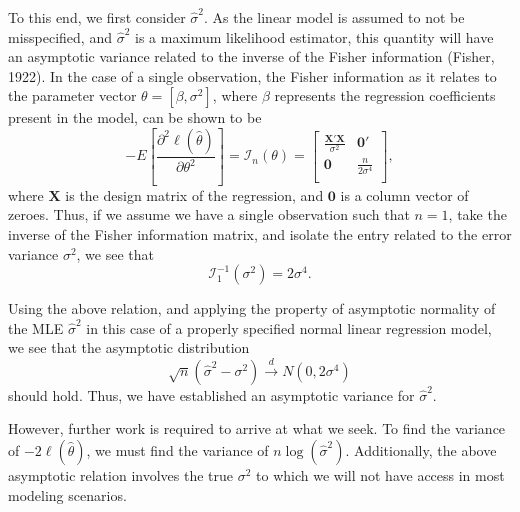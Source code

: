 		To this end, we first consider $\hat{\sigma}^2$. As the linear model is assumed to not be misspecified, and $\hat{\sigma}^2$ is a maximum likelihood
		estimator, this quantity will have an asymptotic variance related to the inverse of the Fisher information (Fisher, 1922). In the case of a single
		observation, the Fisher information as it relates to the parameter vector $\theta = [\beta, \sigma^2]$, where $\beta$ represents the regression coefficients
		present in the model, can be shown to be
		\begin{equation}
			- E \left[ \frac{\partial^2 \ell (\hat{\theta}  )}{\partial \theta^2} \right] = \mathcal{I}_{n}(\theta) =
			\begin{bmatrix}
				\frac{\mathbf{X}' \mathbf{X}}{\sigma^2} & \mathbf{0}' \\
				\mathbf{0} & \frac{n}{2 \sigma^4} \\
			\end{bmatrix}
			,
		\end{equation}
		where $\mathbf{X}$ is the design matrix of the regression, and $\mathbf{0}$ is a column vector of zeroes. Thus, if we assume we have a single observation
		such that $n=1$, take the inverse of the Fisher information matrix, and isolate the entry related to the error variance $\sigma^2$, we see that
		\begin{equation}
			\mathcal{I}_{1}^{-1}(\sigma ^2) = 2 \sigma ^4 .
		\end{equation}
		
		Using the above relation, and applying the property of asymptotic normality of the MLE $\hat{\sigma}^2$ in this case of a properly specified normal linear
		regression model, we see that the asymptotic distribution
		\begin{equation}
			\sqrt{n} (\hat{\sigma}^2 - \sigma^2) \xrightarrow[]{d} N(0, 2 \sigma ^4 )
		\end{equation}
		should hold. Thus, we have established an asymptotic variance for $\hat{\sigma}^2$.

		However, further work is required to arrive at what we seek. To find the variance of $-2 \ell (\hat{\theta}  )$, we must find the variance of $n \log(\hat{\sigma}^2)$.
		Additionally, the above asymptotic relation involves the true $\sigma^2$ to which we will not have access in most modeling scenarios.


